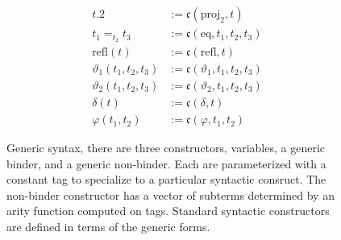 \begin{figure}
\begin{minipage}{0.5\textwidth}
\begin{align*}
            t.2 &:= \mathfrak{c}(\text{proj}_2, t) \\
            t_1 =_{t_2} t_3 &:= \mathfrak{c}(\text{eq}, t_1, t_2, t_3) \\
            \text{refl}(t) &:= \mathfrak{c}(\text{refl}, t) \\
            \vartheta_1(t_1, t_2, t_3) &:= \mathfrak{c}(\vartheta_1, t_1, t_2, t_3) \\
            \vartheta_2(t_1, t_2, t_3) &:= \mathfrak{c}(\vartheta_2, t_1, t_2, t_3) \\
            \delta(t) &:= \mathfrak{c}(\delta, t) \\
            \varphi(t_1, t_2) &:= \mathfrak{c}(\varphi, t_1, t_2)
        \end{align*}
    \end{minipage}
    \vspace{-.05in}
    \caption{Generic syntax, there are three constructors, variables, a generic binder, and a generic non-binder. Each are parameterized with a constant tag to specialize to a particular syntactic consruct. The non-binder constructor has a vector of subterms determined by an arity function computed on tags. Standard syntactic constructors are defined in terms of the generic forms.}
    \label{fig:syntax}
\end{figure}
